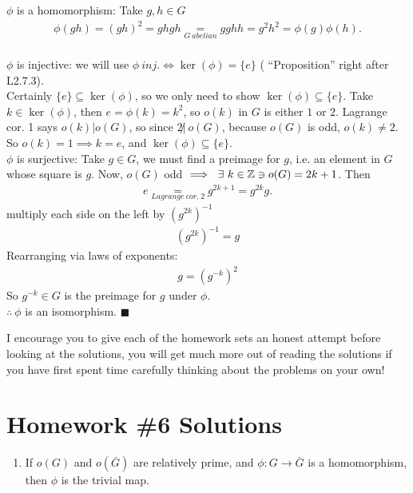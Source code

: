 \begin{enumerate}
    $\phi$ is a homomorphism: Take $g,h \in G$
    \begin{align*}
        \phi(gh) = (gh)^2 = ghgh \underset{G \ abelian}{=} gghh = g^2h^2 = \phi(g)\phi(h).
    \end{align*} \\
    $\phi$ is injective: we will use $\boxed{\phi \ inj. \iff \ker(\phi)=\{e\}}$ ( ``Proposition'' right after L2.7.3). \\
    Certainly $\{e\} \subseteq \ker(\phi)$, so we only need to show $\ker(\phi) \subseteq \{e\}$. Take $k\in \ker(\phi)$, then $e=\phi(k)=k^2$, so $o(k)$ in $G$ is either $1$ or $2$. Lagrange cor. 1 says $o(k)|o(G)$, so since $2 \not | \ o(G)$, because $o(G)$ is odd, $o(k)\neq 2$. So $o(k)=1 \implies k=e$, and $\ker(\phi) \subseteq \{e\}$. \steezybreak \\
    $\phi$ is surjective: Take $g\in G$, we must find a preimage for $g$, i.e. an element in $G$ whose square is $g$. Now, $o(G)$ odd $\implies \ \exists \ k\in {\mathbb{ Z}} \ni o(G)=2k+1$. Then
    \begin{align*}
        e \underset{Lagrange \ cor. \ 2}{=} g^{2k+1} = g^{2k}g.
    \end{align*}
    multiply each side on the left by $(g^{2k})^{-1}$
    \begin{align*}
        (g^{2k})^{-1}= g
    \end{align*}
    Rearranging via laws of exponents:
    \begin{align*}
        g=(g^{-k})^2
    \end{align*}
    So $g^{-k}\in G$ is the preimage for $g$ under $\phi$. \\
    $\therefore \ \phi$ is an isomorphism. $\blacksquare$
\end{enumerate}
\newpage 



\begin{tcolorbox}
    I encourage you to give each of the homework sets an honest attempt before looking at the solutions, you will get much more out of reading the solutions if you have first spent time carefully thinking about the problems on your own!
\end{tcolorbox}
\vspace{-0.2in}
\section{Homework \#6 Solutions}
\begin{enumerate}
    \item If $o(G)$ and $o(\bar{G})$ are relatively prime, and $\phi: G \rightarrow \bar{G}$ is a homomorphism, then $\phi$ is the trivial map.
\end{enumerate}



